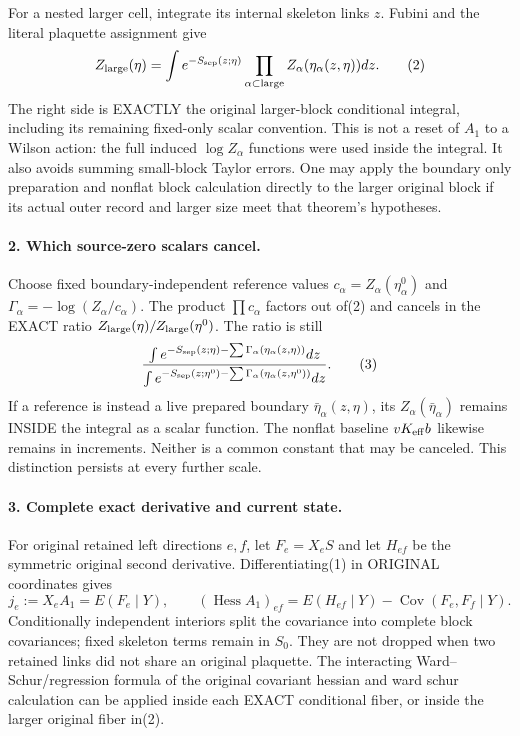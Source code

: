\documentclass[11pt]{article}
\begin{document}
For a nested larger cell, integrate its internal skeleton links $z$. Fubini
and the literal plaquette assignment give
\[
 Z_{\rm large}(\eta)=\int e^{-S_{\rm sep}(z;\eta)}
                    \prod_{\alpha\subset\rm large}Z_\alpha(\eta_\alpha(z,\eta))dz.
                                                                            \tag{2}
\]
The right side is EXACTLY the original larger-block conditional integral,
including its remaining fixed-only scalar convention. This is not a reset of
$A_1$ to a Wilson action: the full induced $\log Z_\alpha$ functions were used
inside the integral. It also avoids summing small-block Taylor errors. One
may apply the boundary only preparation and nonflat block calculation directly to the larger original block if its actual outer
record and larger size meet that theorem's hypotheses.

\paragraph{2. Which source-zero scalars cancel.}
Choose fixed boundary-independent reference values $c_\alpha=Z_\alpha(\eta^0_\alpha)$
and $\Gamma_\alpha=-\log(Z_\alpha/c_\alpha)$. The product
$\prod c_\alpha$ factors out of(2) and cancels in the EXACT ratio
$Z_{\rm large}(\eta)/Z_{\rm large}(\eta^0)$. The ratio is still
\[
 \frac{\int e^{-S_{\rm sep}(z;\eta)-\sum\Gamma_\alpha(\eta_\alpha(z,\eta))}dz}
      {\int e^{-S_{\rm sep}(z;\eta^0)-\sum\Gamma_\alpha(\eta_\alpha(z,\eta^0))}dz}.
                                                                            \tag{3}
\]
If a reference is instead a live prepared boundary $\bar\eta_\alpha(z,\eta)$,
its $Z_\alpha(\bar\eta_\alpha)$ remains INSIDE the integral as a scalar
function. The nonflat baseline $vK_{\rm eff}b$ likewise remains in increments.
Neither is a common constant that may be canceled. This distinction persists
at every further scale.

\paragraph{3. Complete exact derivative and current state.}
For original retained left directions $e,f$, let $F_e=X_eS$ and let $H_{ef}$
be the symmetric original second derivative. Differentiating(1) in ORIGINAL
coordinates gives
\[
 j_e:=X_eA_1=E(F_e\mid Y),\qquad
 (\operatorname{Hess}A_1)_{ef}=E(H_{ef}\mid Y)
                            -\operatorname{Cov}(F_e,F_f\mid Y).         \tag{4}
\]
Conditionally independent interiors split the covariance into complete block
covariances; fixed skeleton terms remain in $S_0$. They are not dropped when
two retained links did not share an original plaquette. The interacting
Ward--Schur/regression formula of the original covariant hessian and ward schur calculation can be applied inside each EXACT
conditional fiber, or inside the larger original fiber in(2).
\end{document}
